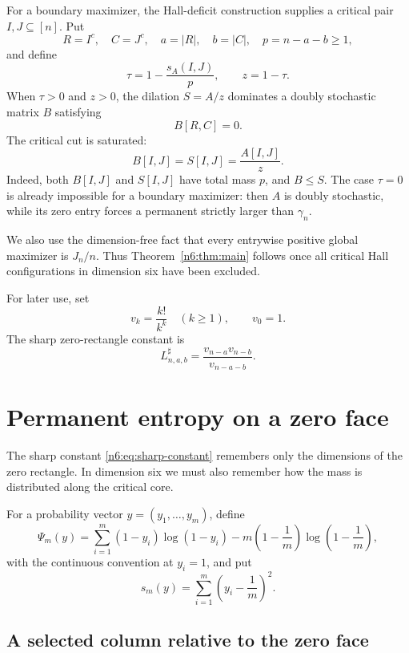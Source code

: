\documentclass[11pt]{article}
\numberwithin{equation}{section}
\theoremstyle{definition}
\begin{document}
For a boundary maximizer, the Hall-deficit construction supplies a critical
pair $I,J\subseteq[n]$.  Put
\[
 R=I^c,
 \quad C=J^c,
 \quad a=|R|,
 \quad b=|C|,
 \quad p=n-a-b\ge1,
\]
and define
\[
 \tau=1-\frac{s_A(I,J)}p,
 \qquad z=1-\tau.
\]
When $\tau>0$ and $z>0$, the dilation $S=A/z$ dominates a doubly stochastic
matrix $B$ satisfying
\begin{equation}
 B[R,C]=0.\label{n6:eq:zero-face}
\end{equation}
The critical cut is saturated:
\begin{equation}
 B[I,J]=S[I,J]=\frac{A[I,J]}z.\label{n6:eq:core-saturation}
\end{equation}
Indeed, both $B[I,J]$ and $S[I,J]$ have total mass $p$, and $B\le S$.
The case $\tau=0$ is already impossible for a boundary maximizer: then $A$ is
doubly stochastic, while its zero entry forces a permanent strictly larger
than $\gamma_n$.

We also use the dimension-free fact that every entrywise positive global
maximizer is $J_n/n$.  Thus Theorem~\ref{n6:thm:main} follows once all critical
Hall configurations in dimension six have been excluded.

For later use, set
\[
 v_k=\frac{k!}{k^k}\quad(k\ge1),
 \qquad v_0=1.
\]
The sharp zero-rectangle constant is
\begin{equation}
 L^{\sharp}_{n,a,b}
 =\frac{v_{n-a}v_{n-b}}{v_{n-a-b}}.\label{n6:eq:sharp-constant}
\end{equation}

\section{Permanent entropy on a zero face}\label{n6:sec:entropy}

The sharp constant \eqref{n6:eq:sharp-constant} remembers only the dimensions
of the zero rectangle.  In dimension six we must also remember how the mass
is distributed along the critical core.

For a probability vector $y=(y_1,\dots,y_m)$, define
\begin{equation}
 \Psi_m(y)
 =\sum_{i=1}^m(1-y_i)\log(1-y_i)
  -m\left(1-\frac1m\right)\log\left(1-\frac1m\right),\label{n6:eq:Psi}
\end{equation}
with the continuous convention at $y_i=1$, and put
\[
 s_m(y)=\sum_{i=1}^m\left(y_i-\frac1m\right)^2.
\]

\subsection{A selected column relative to the zero face}
\end{document}
